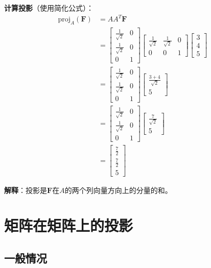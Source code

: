 \documentclass[12pt,a4paper]{article}
\begin{document}
\textbf{计算投影}（使用简化公式）：
\begin{align}
\text{proj}_{A}(\bm{F}) &= A A^T \bm{F} \\
&= \begin{bmatrix} \frac{1}{\sqrt{2}} & 0 \\ \frac{1}{\sqrt{2}} & 0 \\ 0 & 1 \end{bmatrix} \begin{bmatrix} \frac{1}{\sqrt{2}} & \frac{1}{\sqrt{2}} & 0 \\ 0 & 0 & 1 \end{bmatrix} \begin{bmatrix} 3 \\ 4 \\ 5 \end{bmatrix} \\
&= \begin{bmatrix} \frac{1}{\sqrt{2}} & 0 \\ \frac{1}{\sqrt{2}} & 0 \\ 0 & 1 \end{bmatrix} \begin{bmatrix} \frac{3+4}{\sqrt{2}} \\ 5 \end{bmatrix} \\
&= \begin{bmatrix} \frac{1}{\sqrt{2}} & 0 \\ \frac{1}{\sqrt{2}} & 0 \\ 0 & 1 \end{bmatrix} \begin{bmatrix} \frac{7}{\sqrt{2}} \\ 5 \end{bmatrix} \\
&= \begin{bmatrix} \frac{7}{2} \\ \frac{7}{2} \\ 5 \end{bmatrix}
\end{align}

\textbf{解释}：投影是$\bm{F}$在$A$的两个列向量方向上的分量的和。

\section{矩阵在矩阵上的投影}

\subsection{一般情况}
\end{document}
